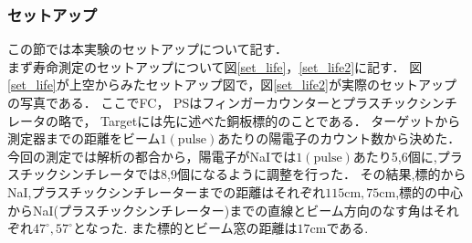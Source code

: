 \subsubsection{セットアップ}
この節では本実験のセットアップについて記す．\\
まず寿命測定のセットアップについて図\ref{set_life}，\ref{set_life2}に記す．
図\ref{set_life}が上空からみたセットアップ図で，図\ref{set_life2}が実際のセットアップの写真である．
ここでFC， PSはフィンガーカウンターとプラスチックシンチレータの略で， Targetには先に述べた銅板標的のことである．
ターゲットから測定器までの距離をビーム$1(\mathrm{pulse})$あたりの陽電子のカウント数から決めた．
今回の測定では解析の都合から，陽電子がNaIでは$1(\mathrm{pulse})$あたり5,6個に,プラスチックシンチレータでは8,9個になるように調整を行った．
その結果,標的からNaI,プラスチックシンチレーターまでの距離はそれぞれ$115\mathrm{cm},75\mathrm{cm}$,標的の中心からNaI(プラスチックシンチレーター)までの直線とビーム方向のなす角はそれぞれ$47^\circ,57^\circ$となった.
また標的とビーム窓の距離は$17\mathrm{cm}$である.
